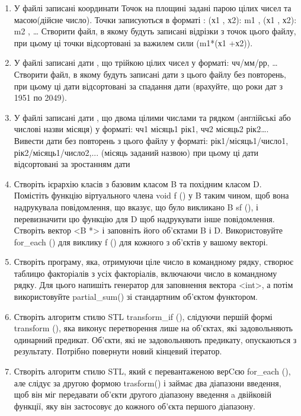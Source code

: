 \documentclass[a5paper,titlepage,openany,twoside,draft]{book_unv}%
\begin{document}
\begin{enumerate}
\item
  У файлі записані координати Точок на площині задані парою цілих чисел
  та масою(дійсне число). Точки записуються в форматі : (х1 , х2): m1 ,
  (х1 , х2): m2 , \ldots{} Створити файл, в якому будуть записані
  відрізки з точок цього файлу, при цьому ці точки відсортовані за
  важилем сили (m1*(х1 +х2)).
\item
  У файлі записані дати , що трійкою цілих чисел у форматі: чч/мм/рр,
  \ldots{} Створити файл, в якому будуть записані дати з цього файлу без
  повторень, при цьому ці дати відсортовані за спадання дати (врахуйте,
  що роки дат з 1951 по 2049).
\item
  У файлі записані дати , що двома цілими числами та рядком (англійські
  або числові назви місяця) у форматі: чч1 місяць1 рік1, чч2 місяць2
  рік2\ldots{}. Вивести дати без повторень з цього файлу у форматі:
  рік1/місяць1/число1, рік2/місяць1/число2,... (місяць заданий назвою)
  при цьому ці дати відсортовані за зростанням дати
\item
  Створіть ієрархію класів з базовим класом B та похідним класом D.
  Помістіть функцію віртуального члена void f () у B таким чином, щоб
  вона надрукувала повідомлення, що вказує, що було викликано B sf (), і
  перевизначити цю функцію для D щоб надрукувати інше повідомлення.
  Створіть вектор \textless{}B *\textgreater{} і заповніть його
  об'єктами B і D. Використовуйте for\_each () для виклику f () для
  кожного з об'єктів у вашому векторі.
\item
  Створіть програму, яка, отримуючи ціле число в командному рядку,
  створює таблицю факторіалів з усіх факторіалів, включаючи число в
  командному рядку. Для цього напишіть генератор для заповнення вектора
  \textless{}int\textgreater{}, а потім використовуйте partial\_sum() 
зі стандартним об'єктом функтором.

\item
  Створіть алгоритм стилю STL transform\_if (), слідуючи першій формі
  transform (), яка виконує перетворення лише на об'єктах, які
  задовольняють одинарний предикат. Об'єкти, які не задовольняють
  предикату, опускаються з результату. Потрібно повернути новий кінцевий
  ітератор.
\item
  Створіть алгоритм стилю STL, який є перевантаженою верCєю for\_each
  (), але слідує за другою формою trasform() і займає два діапазони
  введення, щоб він міг передавати об'єкти другого діапазону введення a
  двійковій функції, яку він застосовує до кожного об'єкта першого
  діапазону.


\end{enumerate}
\end{document}
